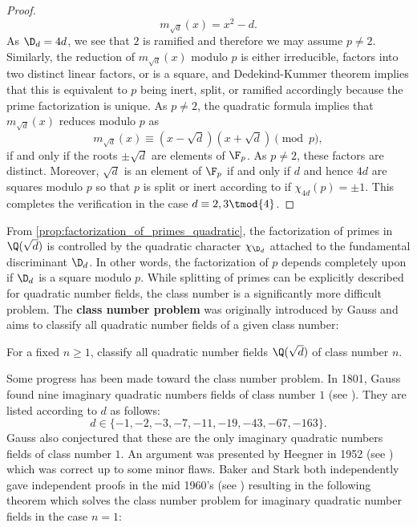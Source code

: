 \begin{proof}
      \[
        m_{\sqrt{d}}(x) = x^{2}-d.
      \]
      As $\D_{d} = 4d$, we see that $2$ is ramified and therefore we may assume $p \neq 2$. Similarly, the reduction of $m_{\sqrt{d}}(x)$ modulo $p$ is either irreducible, factors into two distinct linear factors, or is a square, and Dedekind-Kummer theorem implies that this is equivalent to $p$ being inert, split, or ramified accordingly because the prime factorization is unique. As $p \neq 2$, the quadratic formula implies that $m_{\sqrt{d}}(x)$ reduces modulo $p$ as
      \[
        m_{\sqrt{d}}(x) \equiv (x-\sqrt{d})(x+\sqrt{d}) \pmod{p},
      \]
      if and only if the roots $\pm\sqrt{d}$ are elements of $\F_{p}$. As $p \neq 2$, these factors are distinct. Moreover, $\sqrt{d}$ is an element of $\F_{p}$ if and only if $d$ and hence $4d$ are squares modulo $p$ so that $p$ is split or inert according to if $\chi_{4d}(p) = \pm1$. This completes the verification in the case $d \equiv 2,3 \tmod{4}$.
    \end{proof}

    From \cref{prop:factorization_of_primes_quadratic}, the factorization of primes in $\Q(\sqrt{d})$ is controlled by the quadratic character $\chi_{\D_{d}}$ attached to the fundamental discriminant $\D_{d}$. In other words, the factorization of $p$ depends completely upon if $\D_{d}$ is a square modulo $p$. While splitting of primes can be explicitly described for quadratic number fields, the class number is a significantly more difficult problem. The \textbf{class number problem} was originally introduced by Gauss and aims to classify all quadratic number fields of a given class number:

    \begin{problem}
      For a fixed $n \ge 1$, classify all quadratic number fields $\Q(\sqrt{d})$ of class number $n$.
    \end{problem}

    Some progress has been made toward the class number problem. In 1801, Gauss found nine imaginary quadratic numbers fields of class number $1$ (see \cite{gauss1801disquisitiones}). They are listed according to $d$ as follows:
    \[
      d  \in \{-1,-2,-3,-7,-11,-19,-43,-67,-163\}.
    \]
    Gauss also conjectured that these are the only imaginary quadratic numbers fields of class number $1$. An argument was presented by Heegner in 1952 (see \cite{heegner1952diophantische}) which was correct up to some minor flaws. Baker and Stark both independently gave independent proofs in the mid 1960's (see \cite{baker1967linear,stark1967complete}) resulting in the following theorem which solves the class number problem for imaginary quadratic number fields in the case $n = 1$:

